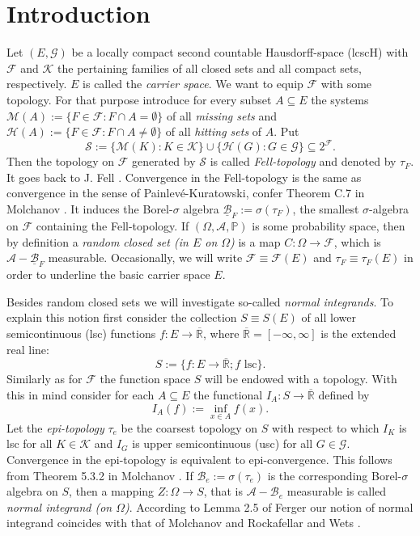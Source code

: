 \documentclass[sn-mathphys,Numbered]{sn-jnl}%
\theoremstyle{thmstyleone}%
\theoremstyle{thmstyletwo}%
\theoremstyle{thmstylethree}%
\begin{document}
\section{Introduction}
Let $(E,\mathcal{G})$ be a locally compact second countable Hausdorff-space (lcscH) with $\mathcal{F}$ and $\mathcal{K}$  the pertaining families of
all closed sets and all compact sets, respectively. $E$ is called the \emph{carrier space}. We want to equip $\mathcal{F}$ with some topology. For that purpose introduce for every subset $A \subseteq E$ the systems
$\mathcal{M}(A):=\{F \in \mathcal{F}: F \cap A = \emptyset\}$ of all \emph{missing sets}
and
$\mathcal{H}(A):=\{F \in \mathcal{F}: F \cap A \neq \emptyset\}$ of all \emph{hitting sets} of $A$.
Put
$$
\mathcal{S}:= \{\mathcal{M}(K): K \in \mathcal{K}\} \cup \{\mathcal{H}(G): G \in \mathcal{G}\} \subseteq 2^\mathcal{F}.
$$
Then the topology  on $\mathcal{F}$ generated by $\mathcal{S}$ is called \emph{Fell-topology} and denoted by $\tau_F$. It goes back to J. Fell \cite{Fell}.
Convergence in the Fell-topology is the same as convergence in the sense of Painlev\'{e}-Kuratowski, confer Theorem C.7 in Molchanov \cite{Molchanov}.
It induces the  Borel-$\sigma$ algebra $\underline{\mathcal{B}}_F := \sigma(\tau_F)$, the smallest $\sigma$-algebra on $\mathcal{F}$ containing
the Fell-topology. If $(\Omega,\mathcal{A}, \mathbb{P})$ is some probability space, then by definition a \emph{random closed set (in $E$ on $\Omega$)} is a map
$C:\Omega \rightarrow \mathcal{F}$, which is $\mathcal{A}-\underline{\mathcal{B}}_F$ measurable. Occasionally, we will write $\mathcal{F} \equiv \mathcal{F}(E)$ and $\tau_F \equiv \tau_F(E)$
in order to underline the basic carrier space $E$.

Besides random closed sets we will investigate
so-called \emph{normal integrands}. To explain this notion first consider the collection $S \equiv S(E)$ of all lower semicontinuous (lsc) functions
$f:E \rightarrow \overline{\mathbb{R}}$, where $\overline{\mathbb{R}}=[-\infty,\infty]$ is the extended real line:
$$
 S :=\{f:E \rightarrow \overline{\mathbb{R}}; f \text{ lsc}\}.
$$
Similarly as for $\mathcal{F}$ the function space $S$ will be endowed with a topology. With this in mind consider for
each $A \subseteq E$ the functional $I_A:S \rightarrow \overline{\mathbb{R}}$ defined by
$$
 I_A(f):= \inf_{x \in A} f(x).
$$
Let the \emph{epi-topology} $\tau_e$ be the coarsest topology on $S$ with respect to which $I_K$ is lsc for all $K \in \mathcal{K}$ and
$I_G$ is upper semicontinuous (usc) for all $G \in \mathcal{G}$. Convergence in the epi-topology is equivalent to epi-convergence. This follows from Theorem 5.3.2 in Molchanov \cite{Molchanov}. If $\mathcal{B}_e:= \sigma(\tau_e)$ is the corresponding Borel-$\sigma$ algebra
on $S$, then a mapping $Z:\Omega \rightarrow S$, that is $\mathcal{A}-\mathcal{B}_e$ measurable is called \emph{normal integrand (on $\Omega$)}.
According to Lemma 2.5 of Ferger \cite{Ferger1} our notion of normal integrand coincides with that of Molchanov \cite{Molchanov} and Rockafellar and Wets \cite{RockWets}.
\end{document}
